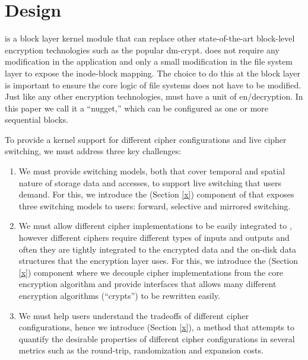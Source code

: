 \section{\sys Design}\label{sec:design}

% 

\sys is a block layer kernel module that can replace other state-of-the-art
block-level encryption technologies such as the popular dm-crypt. \sys does not
require any modification in the application and only a small modification in the
file system layer to expose the inode-block mapping. The choice to do this at
the block layer is important to ensure the core logic of file systems does not
have to be modified. Just like any other encryption technologies, \sys must have
a unit of en/decryption. In this paper we call it a ``nugget,'' which can be
configured as one or more sequential blocks.

To provide a kernel support for different cipher configurations and live cipher
switching, we must address three key challenges:

\begin{enumerate}

\item We must provide switching models, both that cover temporal and spatial
  nature of storage data and accesses, to support live switching that users
  demand. For this, we introduce the \sysA (Section \ref{x}) component of \sys
  that exposes three switching models to users: forward, selective and mirrored
  switching.

\item We must allow different cipher implementations to be easily integrated to
  \sys, however different ciphers require different types of inputs and outputs
  and often they are tightly integrated to the encrypted data and the on-disk
  data structures that the encryption layer uses. For this, we introduce the
  \sysB (Section \ref{x}) component where we decouple cipher implementations
  from the core encryption algorithm and provide interfaces that allows many
  different encryption algorithms (``crypts'') to be rewritten easily.

\item We must help users understand the tradeoffs of different cipher
  configurations, hence we introduce \sysC (Section \ref{x}), a method that
  attempts to quantify the desirable properties of different cipher
  configurations in several metrics such as the round-trip, randomization and
  expansion costs.

\end{enumerate}

